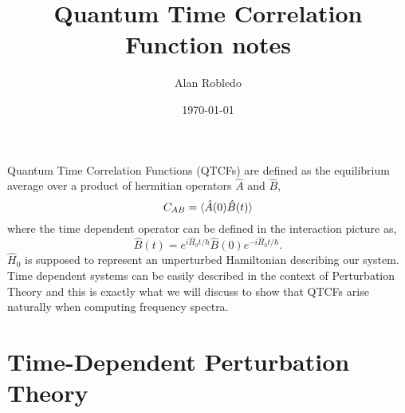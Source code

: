 \documentclass{article}
\title{Quantum Time Correlation Function notes}
\date{\today}
\author{Alan Robledo}
\newcommand{\be}{\begin{equation*}}
\newcommand{\ee}{\end{equation*}}
\begin{document}
\maketitle
Quantum Time Correlation Functions (QTCFs) are defined as the equilibrium average over a product of hermitian operators $\hat{A}$ and $\hat{B}$,
\be
  C_{AB} = \braket{\hat{A}(0) \hat{B}(t)}
\ee
where the time dependent operator can be defined in the interaction picture as,
\be
  \hat{B}(t) = e^{i \hat{H}_0 t/ \hbar} \hat{B}(0) e^{-i \hat{H}_0 t/ \hbar} .
\ee
$\hat{H}_0$ is supposed to represent an unperturbed Hamiltonian describing our system. Time dependent systems can be easily described in the context of Perturbation Theory and this is exactly what we will discuss to show that QTCFs arise naturally when computing frequency spectra.
\section{Time-Dependent Perturbation Theory}
\end{document}
